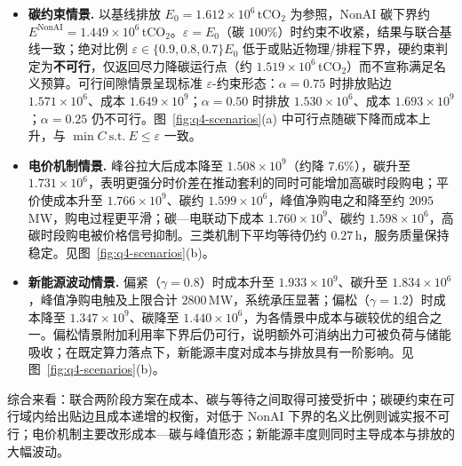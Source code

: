 \begin{itemize}
  \item \textbf{碳约束情景.}
  以基线排放 \(E_0=1.612\times 10^6\)\,tCO\(_2\) 为参照，NonAI 碳下界约 \(E^{\mathrm{NonAI}}=1.449\times 10^6\)\,tCO\(_2\)。\(\varepsilon=E_0\)（碳 \(100\%\)）时约束不收紧，结果与联合基线一致；绝对比例 \(\varepsilon\in\{0.9,0.8,0.7\}E_0\) 低于或贴近物理/排程下界，硬约束判定为\textbf{不可行}，仅返回尽力降碳运行点（约 \(1.519\times 10^6\)\,tCO\(_2\)）而不宣称满足名义预算。可行间隙情景呈现标准 \(\varepsilon\)-约束形态：\(\alpha=0.75\) 时排放贴边 \(1.571\times 10^6\)、成本 \(1.649\times 10^9\)；\(\alpha=0.50\) 时排放 \(1.530\times 10^6\)、成本 \(1.693\times 10^9\)；\(\alpha=0.25\) 仍不可行。图~\ref{fig:q4-scenarios}(a) 中可行点随碳下降而成本上升，与 \(\min C\ \mathrm{s.t.}\ E\le\varepsilon\) 一致。

  \item \textbf{电价机制情景.}
  峰谷拉大后成本降至 \(1.508\times 10^9\)（约降 \(7.6\%\)），碳升至 \(1.731\times 10^6\)，表明更强分时价差在推动套利的同时可能增加高碳时段购电；平价使成本升至 \(1.766\times 10^9\)、碳约 \(1.599\times 10^6\)，峰值净购电之和降至约 \(2095\)\,MW，购电过程更平滑；碳—电联动下成本 \(1.760\times 10^9\)、碳约 \(1.598\times 10^6\)，高碳时段购电被价格信号抑制。三类机制下平均等待仍约 \(0.27\)\,h，服务质量保持稳定。见图~\ref{fig:q4-scenarios}(b)。

  \item \textbf{新能源波动情景.}
  偏紧（\(\gamma=0.8\)）时成本升至 \(1.933\times 10^9\)、碳升至 \(1.834\times 10^6\)，峰值净购电触及上限合计 \(2800\)\,MW，系统承压显著；偏松（\(\gamma=1.2\)）时成本降至 \(1.347\times 10^9\)、碳降至 \(1.440\times 10^6\)，为各情景中成本与碳较优的组合之一。偏松情景附加利用率下界后仍可行，说明额外可消纳出力可被负荷与储能吸收；在既定算力落点下，新能源丰度对成本与排放具有一阶影响。见图~\ref{fig:q4-scenarios}(b)。
\end{itemize}

综合来看：联合两阶段方案在成本、碳与等待之间取得可接受折中；碳硬约束在可行域内给出贴边且成本递增的权衡，对低于 NonAI 下界的名义比例则诚实报不可行；电价机制主要改形成本—碳与峰值形态；新能源丰度则同时主导成本与排放的大幅波动。
